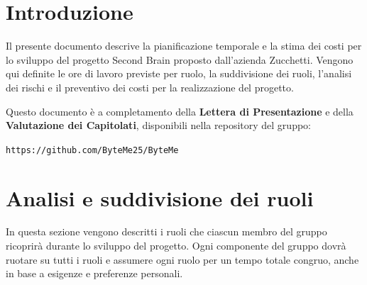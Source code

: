 \documentclass[11pt,a4paper]{article}
\begin{document}
\newpage

\tableofcontents
\thispagestyle{empty}
\newpage

\setcounter{page}{1}

\section{Introduzione}
Il presente documento descrive la pianificazione temporale e la stima dei costi per lo sviluppo del progetto Second Brain proposto dall'azienda Zucchetti. Vengono qui definite le ore di lavoro previste per ruolo, la suddivisione dei ruoli, l'analisi dei rischi e il preventivo dei costi per la realizzazione del progetto.

Questo documento è a completamento della \textbf{Lettera di Presentazione} e della \textbf{Valutazione dei Capitolati}, disponibili nella repository del gruppo:

\begin{center}
\texttt{https://github.com/ByteMe25/ByteMe}
\end{center}

\vspace{1cm}

\section{Analisi e suddivisione dei ruoli}
In questa sezione vengono descritti i ruoli che ciascun membro del gruppo ricoprirà durante lo sviluppo del progetto. Ogni componente del gruppo dovrà ruotare su tutti i ruoli e assumere ogni ruolo per un tempo totale congruo, anche in base a esigenze e preferenze personali.
\end{document}
